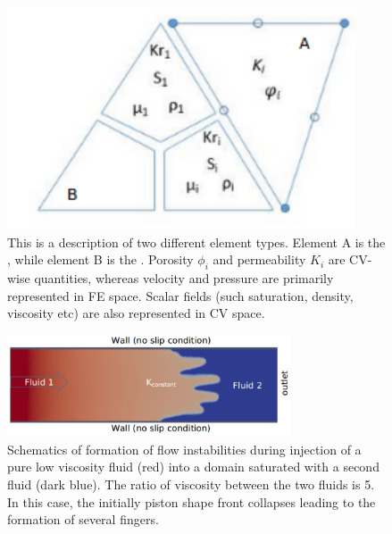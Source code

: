 \begin{figure}[h]
\centering
\vbox{\includegraphics[width=.5\textwidth]{./Pics/element_n.pdf}}
\caption{This is a description of two different element types. Element A is the , while element B is the  . Porosity $\phi_{i}$  and permeability $K_{i}$ are CV-wise quantities, whereas velocity and pressure are primarily represented in FE space. Scalar fields (such saturation, density, viscosity etc) are also represented in CV space.}
\label{fig:fem_elem}
\end{figure}

\clearpage

\begin{figure}[h]
\centering
\vbox{\includegraphics[width=0.75\textwidth]{./Pics/phase_vol_frac_uni_perm_1.pdf}}
\caption{Schematics of formation of flow instabilities during injection of a pure low viscosity fluid (red) into a domain saturated with a second fluid (dark blue). The ratio of viscosity between the two fluids is 5. In this case, the initially piston shape front collapses leading to the formation of several fingers.}
\label{fig:simple_case}
\end{figure}
\clearpage


